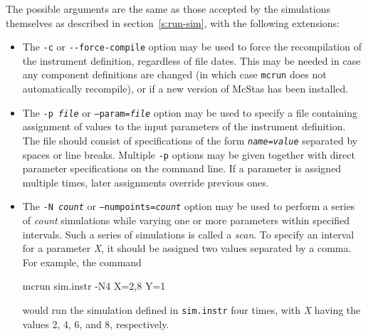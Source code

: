 The possible arguments are the same as those accepted by the simulations
themselves as described in section~\ref{s:run-sim}, with the following
extensions:
\begin{itemize}
\item The \verb+-c+ or \verb+--force-compile+ option may be used to force the
  recompilation of the instrument definition, regardless of file dates. This may
  be needed in case any component definitions are changed (in which case
  \verb+mcrun+ does not automatically recompile), or if a new version of McStas
  has been installed.
\item The \texttt{-p \textit{file}} or \texttt{--param=\textit{file}} option may be
  used to specify a file containing assignment of values to the input parameters
  of the instrument definition. The file should consist of specifications of the
  form \texttt{\textit{name\/}=\textit{value\/}} separated by spaces or line
  breaks. Multiple \verb+-p+ options may be given together with direct parameter
  specifications on the command line. If a parameter is assigned multiple times,
  later assignments override previous ones.
\item The \texttt{-N \textit{count}} or \texttt{--numpoints=\textit{count}} option
  may be used to perform a series of \textit{count\/} simulations while
  varying one or more parameters within specified intervals. Such a
  series of simulations is called a \emph{scan}. To specify
  an interval for a parameter \textit{X}, it should be assigned two
  values separated by a comma. For example, the command
\begin{bash}
mcrun sim.instr -N4 X=2,8 Y=1
\end{bash}
would run the simulation defined in \verb+sim.instr+ four times, with
\textit{X} having the values 2, 4, 6, and 8, respectively.


\end{itemize}
